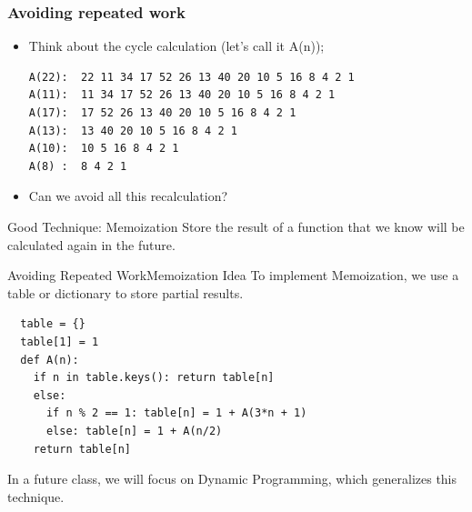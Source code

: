 \begin{frame}[fragile]
  \frametitle{Avoiding repeated work}

  \begin{itemize}
    \item Think about the cycle calculation (let's call it A(n));
\begin{verbatim}
A(22):  22 11 34 17 52 26 13 40 20 10 5 16 8 4 2 1
A(11):  11 34 17 52 26 13 40 20 10 5 16 8 4 2 1
A(17):  17 52 26 13 40 20 10 5 16 8 4 2 1
A(13):  13 40 20 10 5 16 8 4 2 1
A(10):  10 5 16 8 4 2 1
A(8) :  8 4 2 1
\end{verbatim}
    \bigskip

    \item Can we avoid all this recalculation?
  \end{itemize}

  \begin{block}{Good Technique: Memoization}
    Store the result of a function that we know will be calculated again in the future. 
  \end{block}
\end{frame}

\begin{frame}[fragile]{Avoiding Repeated Work}{Memoization Idea}
  To implement \alert{Memoization}, we use a table or dictionary to store partial results.
\begin{verbatim}
  table = {}
  table[1] = 1
  def A(n):
    if n in table.keys(): return table[n]
    else:
      if n % 2 == 1: table[n] = 1 + A(3*n + 1)
      else: table[n] = 1 + A(n/2)
    return table[n]
\end{verbatim}
In a future class, we will focus on \alert{Dynamic Programming}, which generalizes this technique.
\end{frame}

%
%
%

